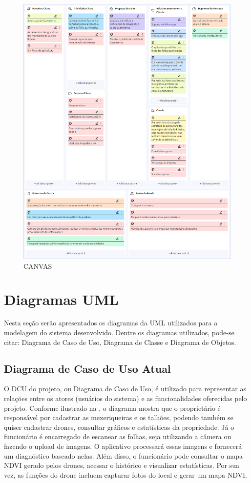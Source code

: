 \documentclass[
    a4paper,%
    12pt,%
    english,%
    brazilian,%
]{article}
\begin{document}
\begin{figure}[H]
\centering
\caption{CANVAS}%
\label{fig:canvas}
\includegraphics[width=0.8\linewidth]{Logos/canvas.png}
\end{figure}

\centering
\section*{Diagramas UML}
    Nesta seção serão apresentados os diagramas da UML utilizados para a modelagem do sistema desenvolvido. Dentre os diagramas utilizados, pode-se citar: Diagrama de Caso de Uso, Diagrama de Classe e Diagrama de Objetos.
    
    \subsection*{Diagrama de Caso de Uso Atual}

    O DCU do projeto, ou Diagrama de Caso de Uso, é utilizado para representar as relações entre os atores (usuários do sistema) e as funcionalidades oferecidas pelo projeto. Conforme ilustrado na , o diagrama mostra que o proprietário é responsável por cadastrar as mexeriqueiras e os talhões, podendo também se quiser cadastrar drones, consultar gráficos e estatísticas da propriedade. Já o funcionário é encarregado de escanear as folhas, seja utilizando a câmera ou fazendo o upload de imagens. O aplicativo processará essas imagens e fornecerá um diagnóstico baseado nelas. Além disso, o funcionário pode consultar o mapa NDVI gerado pelos drones, acessar o histórico e visualizar estatísticas. Por sua vez, as funções do drone incluem capturar fotos do local e gerar um mapa NDVI.
\end{document}
